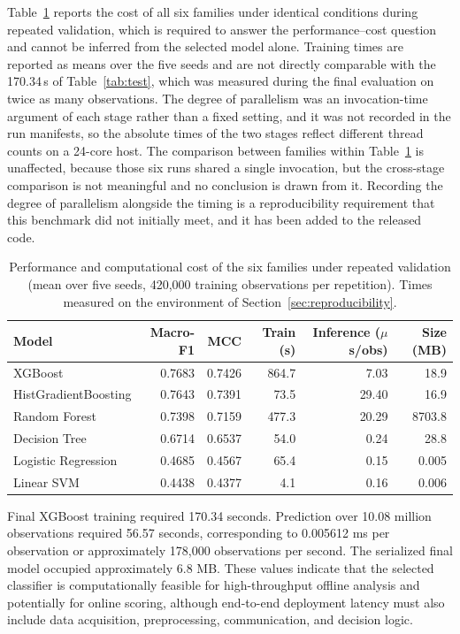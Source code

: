 \documentclass[10pt,twocolumn,a4paper]{article}
\begin{document}
Table~\ref{tab:cost} reports the cost of all six families under identical
conditions during repeated validation, which is required to answer the
performance--cost question and cannot be inferred from the selected model
alone. Training times are reported as means over the five seeds and are
not directly comparable with the 170.34\,s of Table~\ref{tab:test}, which was
measured during the final evaluation on twice as many observations. The
degree of parallelism was an invocation-time argument of each stage rather
than a fixed setting, and it was not recorded in the run manifests, so the
absolute times of the two stages reflect different thread counts on a 24-core
host. The comparison between families within Table~\ref{tab:cost} is
unaffected, because those six runs shared a single invocation, but the
cross-stage comparison is not meaningful and no conclusion is drawn from it.
Recording the degree of parallelism alongside the timing is a reproducibility
requirement that this benchmark did not initially meet, and it has been added
to the released code.

\begin{table}[t]
\centering
\caption{Performance and computational cost of the six families under repeated
validation (mean over five seeds, 420,000 training observations per
repetition). Times measured on the environment of
Section~\ref{sec:reproducibility}.}
\label{tab:cost}
\small
\begin{tabular}{lrrrrr}
\toprule
Model & Macro-F1 & MCC & Train (s) & Inference ($\mu$s/obs) & Size (MB)\\
\midrule
XGBoost              & 0.7683 & 0.7426 & 864.7 & 7.03 & 18.9\\
HistGradientBoosting & 0.7643 & 0.7391 & 73.5 & 29.40 & 16.9\\
Random Forest        & 0.7398 & 0.7159 & 477.3 & 20.29 & 8703.8\\
Decision Tree        & 0.6714 & 0.6537 & 54.0 & 0.24 & 28.8\\
Logistic Regression  & 0.4685 & 0.4567 & 65.4 & 0.15 & 0.005\\
Linear SVM           & 0.4438 & 0.4377 & 4.1 & 0.16 & 0.006\\
\bottomrule
\end{tabular}
\end{table}

Final XGBoost training required 170.34 seconds. Prediction over 10.08 million
observations required 56.57 seconds, corresponding to 0.005612 ms per
observation or approximately 178,000 observations per second. The serialized
final model occupied approximately 6.8 MB. These values indicate that the
selected classifier is computationally feasible for high-throughput offline
analysis and potentially for online scoring, although end-to-end deployment
latency must also include data acquisition, preprocessing, communication, and
decision logic.
\end{document}
